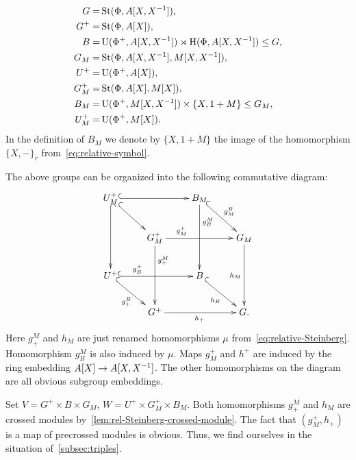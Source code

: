 \begin{align*}
    G     =& \operatorname{St}(\Phi, A[X, X^{-1}]),\\
    G^+   =& \operatorname{St}(\Phi, A[X]),\\
    B     =& \operatorname{U}(\Phi^+, A[X, X^{-1}]) \rtimes \operatorname{H}(\Phi, A[X, X^{-1}]) \leq G,\\
    G_M   =& \operatorname{St}(\Phi, A[X, X^{-1}], M[X, X^{-1}]),\\
    U^+   =& \operatorname{U}(\Phi^+, A[X]),\\
    G^+_M =& \operatorname{St}(\Phi, A[X], M[X]),\\
    B_M   =& \operatorname{U}(\Phi^+, M[X, X^{-1}]) \times \{X, 1+M\} \leq G_M,\\
    U^+_M =& \operatorname{U}(\Phi^+, M[X]).
\end{align*}
In the definition of $B_M$ we denote by $\{X, 1+M\}$ the image of the homomorphism $\{X, -\}_{r}$ from~\eqref{eq:relative-symbol}.

The above groups can be organized into the following commutative diagram:
\begin{equation} \label{eq:cube-Steinberg} \xymatrix{
    U^+_M \ar@{^{(}->}[rr] \ar@{^{(}->}[dd] \ar@{^{(}->}[rd] &                        & B_M \ar[dd]^(.3){g_B^M} \ar@{^{(}->}[rd]^{g^B_M} &           \\
    & G^+_M \ar[rr]^(.3){g^+_M} \ar^(.3){g^M_+}[dd] &                   & G_M \ar[dd]_{h_M} \\
    U^+ \ar@{^{(}->}[rr]^(.3){g_B^+} \ar@{^{(}->}[rd]_{g_+^B}          &                        & B \ar@{^{(}->}[rd]_{h_B}       &           \\
    & G^+ \ar[rr]_{h_+}              &                   & G.}\end{equation}
Here $g^M_+$ and $h_M$ are just renamed homomorphisms $\mu$ from~\eqref{eq:relative-Steinberg}.
Homomorphism $g^M_B$ is also induced by $\mu$.
Maps $g_M^+$ and $h^+$ are induced by the ring embedding $A[X] \to A[X, X^{-1}]$.
The other homomorphisms on the diagram are all obvious subgroup embeddings.

Set $V = G^+\times B \times G_M$, $W = U^+\times G^+_M \times B_M$.
Both homomorphisms $g_+^M$ and $h_M$ are crossed modules by~\cref{lem:rel-Steinberg-crossed-module}.
The fact that $(g^+_M, h_+)$ is a map of precrossed modules is obvious.
Thus, we find ourselves in the situation of~\cref{subsec:triples}.

